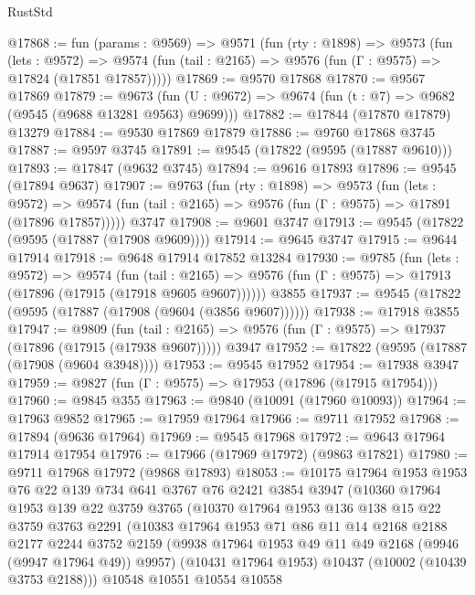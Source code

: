\begin{lexlean}{RustStd}
\begin{coremodule}
@17868 := fun (params : @9569) =>
  @9571
    (fun (rty : @1898) =>
    @9573
      (fun (lets : @9572) =>
      @9574 (fun (tail : @2165) => @9576 (fun (Γ : @9575) => @17824 (@17851 @17857)))))
@17869 := @9570 @17868
@17870 := @9567 @17869
@17879 := @9673
    (fun (U : @9672) => @9674 (fun (t : @7) => @9682 (@9545 (@9688 @13281 @9563) @9699)))
@17882 := @17844 (@17870 @17879) @13279
@17884 := @9530 @17869 @17879
@17886 := @9760 @17868 @3745
@17887 := @9597 @3745
@17891 := @9545 (@17822 (@9595 (@17887 @9610)))
@17893 := @17847 (@9632 @3745)
@17894 := @9616 @17893
@17896 := @9545 (@17894 @9637)
@17907 := @9763
    (fun (rty : @1898) =>
    @9573
      (fun (lets : @9572) =>
      @9574 (fun (tail : @2165) => @9576 (fun (Γ : @9575) => @17891 (@17896 @17857)))))
    @3747
@17908 := @9601 @3747
@17913 := @9545 (@17822 (@9595 (@17887 (@17908 @9609))))
@17914 := @9645 @3747
@17915 := @9644 @17914
@17918 := @9648 @17914 @17852 @13284
@17930 := @9785
    (fun (lets : @9572) =>
    @9574
      (fun (tail : @2165) =>
      @9576 (fun (Γ : @9575) => @17913 (@17896 (@17915 (@17918 @9605 @9607))))))
    @3855
@17937 := @9545 (@17822 (@9595 (@17887 (@17908 (@9604 (@3856 @9607))))))
@17938 := @17918 @3855
@17947 := @9809
    (fun (tail : @2165) => @9576 (fun (Γ : @9575) => @17937 (@17896 (@17915 (@17938 @9607)))))
    @3947
@17952 := @17822 (@9595 (@17887 (@17908 (@9604 @3948))))
@17953 := @9545 @17952
@17954 := @17938 @3947
@17959 := @9827 (fun (Γ : @9575) => @17953 (@17896 (@17915 @17954)))
@17960 := @9845 @355
@17963 := @9840 (@10091 (@17960 @10093))
@17964 := @17963 @9852
@17965 := @17959 @17964
@17966 := @9711 @17952
@17968 := @17894 (@9636 @17964)
@17969 := @9545 @17968
@17972 := @9643 @17964 @17914 @17954
@17976 := @17966 (@17969 @17972) (@9863 @17821)
@17980 := @9711 @17968 @17972 (@9868 @17893)
@18053 := @10175
    @17964
    @1953
    @1953
    @76
    @22
    @139
    @734
    @641
    @3767
    @76
    @2421
    @3854
    @3947
    (@10360
      @17964
      @1953
      @139
      @22
      @3759
      @3765
      (@10370
        @17964
        @1953
        @136
        @138
        @15
        @22
        @3759
        @3763
        @2291
        (@10383
          @17964
          @1953
          @71
          @86
          @11
          @14
          @2168
          @2188
          @2177
          @2244
          @3752
          @2159
          (@9938 @17964 @1953 @49 @11 @49 @2168 (@9946 (@9947 @17964 @49)) @9957)
          (@10431 @17964 @1953)
          @10437
          (@10002 (@10439 @3753 @2188)))
        @10548
        @10551
        @10554
        @10558

\end{coremodule}
\end{lexlean}
